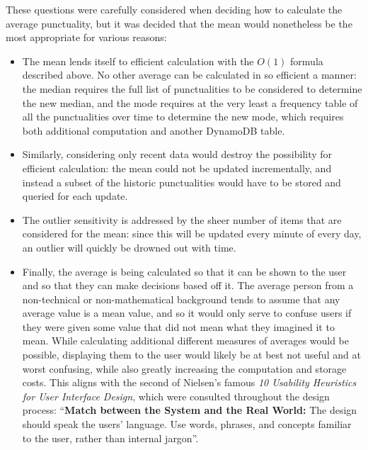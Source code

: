 \documentclass[a4paper,11pt]{report}
\begin{document}
These questions were carefully considered when deciding how to calculate the average punctuality, but it was decided that the mean would nonetheless be the most appropriate for various reasons:
\begin{itemize}
  \item   The mean lends itself to efficient calculation with the $O(1)$ formula described above.
          No other average can be calculated in so efficient a manner:
          the median requires the full list of punctualities to be considered to determine the new median, and the mode requires at the very least a frequency table of all the punctualities over time to determine the new mode, which requires both additional computation and another DynamoDB table.

  \item   Similarly, considering only recent data would destroy the possibility for efficient calculation:
          the mean could not be updated incrementally, and instead a subset of the historic punctualities would have to be stored and queried for each update.

  \item   The outlier sensitivity is addressed by the sheer number of items that are considered for the mean:
          since this will be updated every minute of every day, an outlier will quickly be drowned out with time.

  \item   Finally, the average is being calculated so that it can be shown to the user and so that they can make decisions based off it.
          The average person from a non-technical or non-mathematical background tends to assume that any average value is a mean value, and so it would only serve to confuse users if they were given some value that did not mean what they imagined it to mean.
          While calculating additional different measures of averages would be possible, displaying them to the user would likely be at best not useful and at worst confusing, while also greatly increasing the computation and storage costs.
          This aligns with the second of Nielsen's famous \textit{10 Usability Heuristics for User Interface Design}, which were consulted throughout the design process: ``\textbf{Match between the System and the Real World:} The design should speak the users' language. Use words, phrases, and concepts familiar to the user, rather than internal jargon''\supercite{nielsenheuristics}.
\end{itemize}
\end{document}
